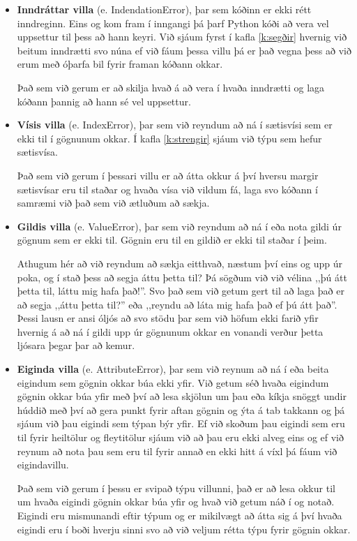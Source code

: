 \begin{itemize}[leftmargin=*]
	\item \textbf{Inndráttar villa} (e. IndendationError), þar sem kóðinn er ekki rétt inndreginn.
	Eins og kom fram í inngangi þá þarf Python kóði að vera vel uppsettur til þess að hann keyri.
	Við sjáum fyrst í kafla \ref{k:segðir} hvernig við beitum inndrætti svo núna ef við fáum þessa villu þá er það vegna þess að við erum með óþarfa bil fyrir framan kóðann okkar. 
	
	Það sem við gerum er að skilja hvað á að vera í hvaða inndrætti og laga kóðann þannig að hann sé vel uppsettur.
	
	\item \textbf{Vísis villa} (e. IndexError), þar sem við reyndum að ná í sætisvísi sem er ekki til í gögnunum okkar.
	Í kafla \ref{k:strengir} sjáum við týpu sem hefur sætisvísa.
	
	Það sem við gerum í þessari villu er að átta okkur á því hversu margir sætisvísar eru til staðar og hvaða vísa við vildum fá, laga svo kóðann í samræmi við það sem við ætluðum að sækja.
	
	\item \textbf{Gildis villa} (e. ValueError), þar sem við reyndum að ná í eða nota gildi úr gögnum sem er ekki til.
	Gögnin eru til en gildið er ekki til staðar í þeim.
	
	Athugum hér að við reyndum að sækja eitthvað, næstum því eins og upp úr poka, og í stað þess að segja áttu þetta til? Þá sögðum við við vélina ,,þú átt þetta til, láttu mig hafa það!''. Svo það sem við getum gert til að laga það er að segja ,,áttu þetta til?'' eða ,,reyndu að láta mig hafa það ef þú átt það''. 
	Þessi lausn er ansi óljós að svo stödu þar sem við höfum ekki farið yfir hvernig á að ná í gildi upp úr gögnunum okkar en vonandi verður þetta ljósara þegar þar að kemur.
	
	\item \textbf{Eiginda villa} (e. AttributeError), þar sem við reynum að ná í eða beita eigindum sem gögnin okkar búa ekki yfir.
	Við getum séð hvaða eigindum gögnin okkar búa yfir með því að lesa skjölun um þau eða kíkja snöggt undir húddið með því að gera punkt fyrir aftan gögnin og ýta á tab takkann og þá sjáum við þau eigindi sem týpan býr yfir.
	Ef við skoðum þau eigindi sem eru til fyrir heiltölur og fleytitölur sjáum við að þau eru ekki alveg eins og ef við reynum að nota þau sem eru til fyrir annað en ekki hitt á víxl þá fáum við eigindavillu.
	
	Það sem við gerum í þessu er svipað týpu villunni, það er að lesa okkur til um hvaða eigindi gögnin okkar búa yfir og hvað við getum náð í og notað.
	Eigindi eru mismunandi eftir týpum og er mikilvægt að átta sig á því hvaða eigindi eru í boði hverju sinni svo að við veljum rétta týpu fyrir gögnin okkar.
\end{itemize}

